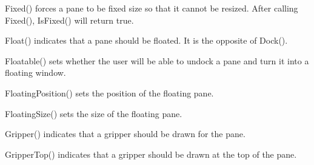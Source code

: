 \label{wxauipaneinfofixed}


Fixed() forces a pane to be fixed size so that it cannot be resized. After calling Fixed(), IsFixed() will return true.

\label{wxauipaneinfofloat}


Float() indicates that a pane should be floated.  It is the opposite of Dock().

\label{wxauipaneinfofloatable}


Floatable() sets whether the user will be able to undock a pane and turn it into a floating window.

\label{wxauipaneinfofloatingposition}



FloatingPosition() sets the position of the floating pane.

\label{wxauipaneinfofloatingsize}



FloatingSize() sets the size of the floating pane.

\label{wxauipaneinfogripper}


Gripper() indicates that a gripper should be drawn for the pane.

\label{wxauipaneinfogrippertop}


GripperTop() indicates that a gripper should be drawn at the top of the pane.

\label{wxauipaneinfohasborder}

